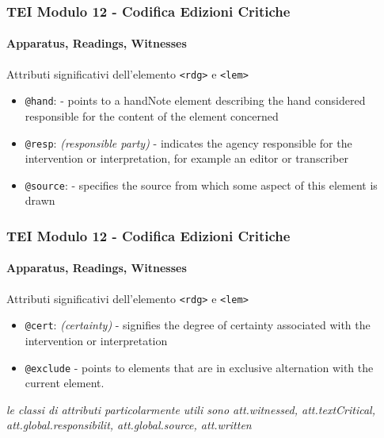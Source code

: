 \begin{frame}
    \frametitle{TEI Modulo 12 - Codifica Edizioni Critiche}
    \framesubtitle{Apparatus, Readings, Witnesses}
    \addtocounter{nframe}{1}

      
    \begin{block}{Attributi significativi dell'elemento \texttt{<rdg>} e \texttt{<lem>}}
        \begin{itemize}
            \item \texttt{@hand}: \textit{} - points to a handNote element describing the hand considered responsible for the content of the element concerned
            \item \texttt{@resp}: \textit{(responsible party)} - indicates the agency responsible for the intervention or interpretation, for example an editor or transcriber
            \item \texttt{@source}: \textit{} - specifies the source from which some aspect of this element is drawn
        \end{itemize}
    \end{block}

\end{frame}

\begin{frame}
    \frametitle{TEI Modulo 12 - Codifica Edizioni Critiche}
    \framesubtitle{Apparatus, Readings, Witnesses}
    \addtocounter{nframe}{1}

      
    \begin{block}{Attributi significativi dell'elemento \texttt{<rdg>} e \texttt{<lem>}}
        \begin{itemize}
            \item \texttt{@cert}: \textit{(certainty)} - signifies the degree of certainty associated with the intervention or interpretation
            \item \texttt{@exclude}	\textit{} - points to elements that are in exclusive alternation with the current element.
        \end{itemize}
    \end{block}

    \textit{le classi di attributi particolarmente utili sono att.witnessed, att.textCritical, att.global.responsibilit, att.global.source, att.written}

\end{frame}


